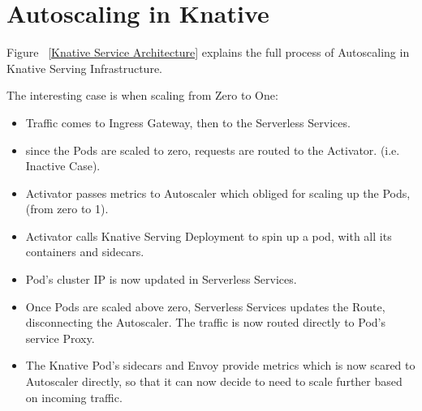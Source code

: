 \documentclass{article}
\begin{document}
\section{Autoscaling in Knative}
Figure ~\ref{Knative Service Architecture} explains the full process of Autoscaling in Knative Serving Infrastructure.
\begin{flushleft}
The interesting case is when scaling from Zero to One:
\begin{itemize}
\item  Traffic comes to Ingress Gateway, then to the Serverless Services.
\item since the Pods are scaled to zero, requests are routed to the Activator. (i.e. Inactive Case).
\item Activator passes metrics to Autoscaler which obliged for scaling up the Pods, (from zero to 1).
\item Activator calls Knative Serving Deployment to spin up a pod, with all its containers and sidecars. 
\item Pod's cluster IP is now updated in Serverless Services.
\item Once Pods are scaled above zero, Serverless Services updates the Route, disconnecting the Autoscaler. The traffic is now routed directly to Pod's service Proxy.
\item The Knative Pod's sidecars and Envoy provide metrics which is now scared to Autoscaler directly, so that it can now decide to need to scale further based on incoming traffic.
\end{itemize}
\end{flushleft}
\end{document}
